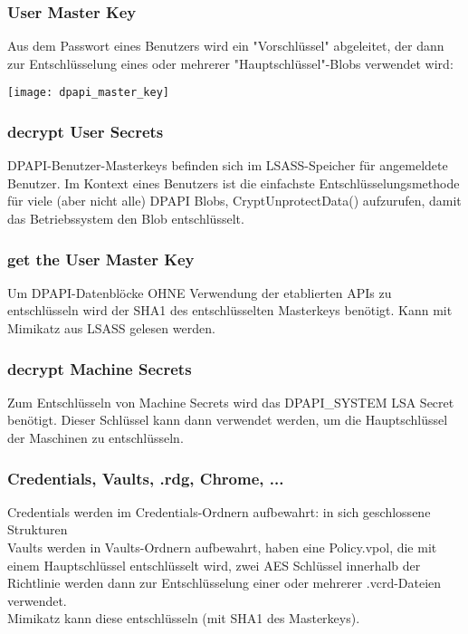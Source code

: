 \subsubsection{User Master Key}
Aus dem Passwort eines Benutzers wird ein "Vorschlüssel" abgeleitet, der dann zur Entschlüsselung eines oder mehrerer "Hauptschlüssel"-Blobs verwendet wird:
\begin{center}
    \vspace{-8pt}
    \texttt{[image: dpapi\_master\_key]}
    \vspace{-8pt}
\end{center}

\subsubsection{decrypt User Secrets}
DPAPI-Benutzer-Masterkeys befinden sich im LSASS-Speicher für angemeldete Benutzer. Im Kontext eines Benutzers ist die einfachste Entschlüsselungsmethode für viele (aber nicht alle) DPAPI Blobs, CryptUnprotectData() aufzurufen, damit das Betriebssystem den Blob entschlüsselt.

\subsubsection{get the User Master Key}
Um DPAPI-Datenblöcke OHNE Verwendung der etablierten APIs zu entschlüsseln wird der SHA1 des entschlüsselten Masterkeys benötigt. Kann mit Mimikatz aus LSASS gelesen werden.

\subsubsection{decrypt Machine Secrets}
Zum Entschlüsseln von Machine Secrets wird das DPAPI\_SYSTEM LSA Secret benötigt. Dieser Schlüssel kann dann verwendet werden, um die Hauptschlüssel der Maschinen zu entschlüsseln.

\subsubsection{Credentials, Vaults, .rdg, Chrome, ...}
Credentials werden im Credentials-Ordnern aufbewahrt: in sich geschlossene Strukturen\\
Vaults werden in Vaults-Ordnern aufbewahrt, haben eine Policy.vpol, die mit einem Hauptschlüssel entschlüsselt wird, zwei AES Schlüssel innerhalb der Richtlinie werden dann zur Entschlüsselung einer oder mehrerer .vcrd-Dateien verwendet.\\
Mimikatz kann diese entschlüsseln (mit SHA1 des Masterkeys). %

